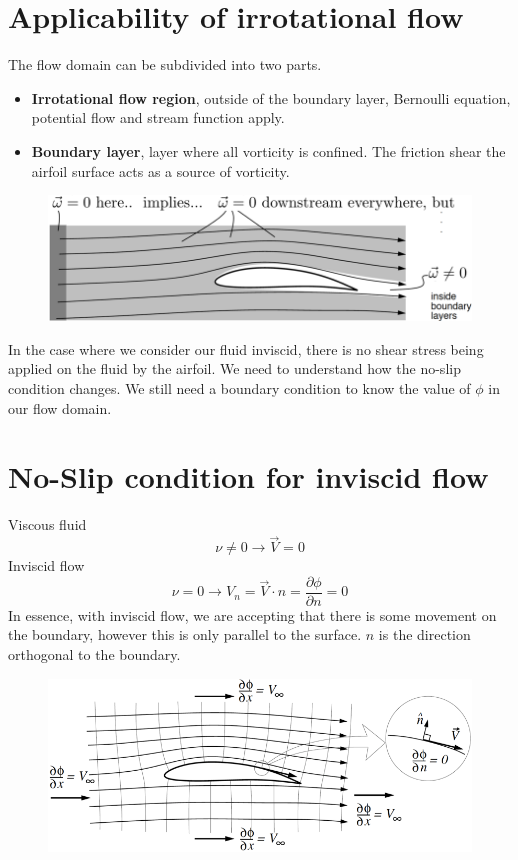 \documentclass[class=report, crop=false, 12pt,a4paper]{standalone}
\begin{document}
\section{Applicability of irrotational flow}
The flow domain can be subdivided into two parts.
\begin{itemize}
  \item \textbf{Irrotational flow region}, outside of the boundary layer, Bernoulli equation, potential flow and stream function apply.
  \item \textbf{Boundary layer}, layer where all vorticity is confined. The friction shear the airfoil surface acts as a source of vorticity.
\end{itemize}
\begin{figure}[H]
  \centering
  \includegraphics[width = 0.8 \textwidth]{../img/diagram13.png}
\end{figure}
In the case where we consider our fluid inviscid, there is no shear stress being applied on the fluid by the airfoil. We need to understand how the no-slip condition changes. We still need a boundary condition to know the value of $\phi$ in our flow domain.
\section{No-Slip condition for inviscid flow}
Viscous fluid
\begin{equation}
  \nu \neq 0 \rightarrow \vec{V} = 0
\end{equation}
Inviscid flow
\begin{equation}
  \nu = 0 \rightarrow V_n = \vec{V} \cdot \hat{n} = \frac{\partial \phi}{\partial n} = 0
\end{equation}
In essence, with inviscid flow, we are accepting that there is some movement on the boundary, however this is only parallel to the surface. $n$ is the direction orthogonal to the boundary.
\begin{figure}[H]
  \centering
  \includegraphics[width = 0.8 \textwidth]{../img/diagram14.png}
\end{figure}
\end{document}
